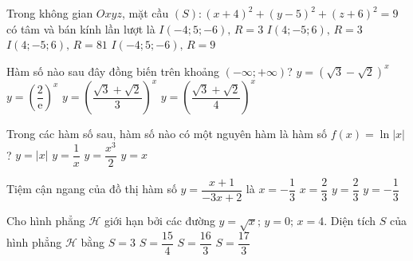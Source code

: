 \begin{ex}%
	Trong không gian $Oxyz$, mặt cầu $(S)\colon(x+4)^2+(y-5)^2+(z+6)^2=9$ có tâm và bán kính lần lượt là
	\choice
	{\True $I(-4;5;-6),\,R=3$}
	{$I(4;-5;6),\,R=3$}
	{$I(4;-5;6),\,R=81$}
	{$I(-4;5;-6),\,R=9$}
\end{ex}

\begin{ex}%
	Hàm số nào sau đây đồng biến trên khoảng $(-\infty;+\infty)$?
	\choice
	{$y=\left(\sqrt{3}-\sqrt{2}\right)^x$}
	{$y=\left(\dfrac{2}{\text{e}}\right)^x$}
	{\True $y=\left(\dfrac{\sqrt{3}+\sqrt{2}}{3}\right)^x$}
	{$y=\left(\dfrac{\sqrt{3}+\sqrt{2}}{4}\right)^x$}
\end{ex}

\begin{ex}%
	Trong các hàm số sau, hàm số nào có một nguyên hàm là hàm số $f(x)=\ln\left|x\right|$?
	\choice
	{$y=\left|x\right|$}
	{\True $y=\dfrac{1}{x}$}
	{$y=\dfrac{x^{3}}{2}$}
	{$y=x$}
\end{ex}

\begin{ex}%
	Tiệm cận ngang của đồ thị hàm số $y=\dfrac{x+1}{-3x+2}$ là
	\choice
	{$x=-\dfrac{1}{3}$}
	{$x=\dfrac{2}{3}$}
	{$y=\dfrac{2}{3}$}
	{\True $y=-\dfrac{1}{3}$}
\end{ex}

\begin{ex}%
	Cho hình phẳng $\mathscr{H}$ giới hạn bởi các đường $y=\sqrt{x};\,y=0;\,x=4$. Diện tích $S$ của hình phẳng $\mathscr{H}$ bằng
	\choice
	{$S=3$}
	{$S=\dfrac{15}{4}$}
	{\True $S=\dfrac{16}{3}$}
	{$S=\dfrac{17}{3}$}
\end{ex}

